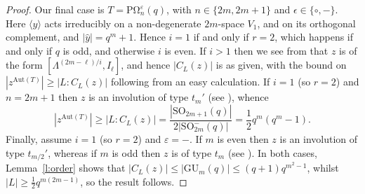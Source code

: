\documentclass[twoside,a4paper,reqno,11pt]{amsart}
\newcommand{\wy}{\widehat{y}}
\newcommand{\<}{\langle}
\renewcommand{\>}{\rangle}
\newcommand{\la}{\langle}
\newcommand{\ra}{\rangle}
\newcommand{\leqs}{\leqslant}
\newcommand{\geqs}{\geqslant}
\def\le{\leqs}
\newcommand{\Aut}{\mathrm{Aut}}
\newcommand{\POmega}{\mathrm{P\Omega}}
\newcommand{\GU}{\mathrm{GU}}
\theoremstyle{definition}
\begin{document}
\begin{proof}
Our final case is $T = \POmega_{n}^\varepsilon(q)$, with $n \in \{2m, 2m+1\}$ and $\epsilon \in \{\circ, -\}$.
Here $\la y \ra$ acts irreducibly on a non-degenerate $2m$-space $V_1$, and on its orthogonal complement, and $|\wy| = q^{m}+1$. Hence $i = 1$ if and only if $r = 2$, which happens if and only if $q$ is odd, and otherwise $i$ is even. 
If $i > 1$ then we see from \cite[Table~B.12]{BG_classical} that $z$ is of the form $[\Lambda^{(2m-\ell)/i},I_{\ell}]$, and hence $|C_{L}(z)|$ is as given, with the bound on $|z^{\Aut(T)}| \geqs |L:C_L(z)|$ following from an easy calculation.
If $i = 1$ (so $r = 2$) and $n = 2m+1$ then $z$ is an involution of type $t_m'$ (see \cite[Section 3.5.2.2]{BG_classical}), whence 
\begin{equation*}
|z^{\Aut(T)}|\geqs |L:C_L(z)| = \frac{|\mathrm{SO}_{2m+1}(q)|}{2|\mathrm{SO}_{2m}^-(q)|} = \frac{1}{2}q^m(q^m-1).
\end{equation*}
Finally, assume $i = 1$ (so $r = 2$) and $\varepsilon = -$. If $m$ is even then $z$ is an involution of type $t_{m/2}'$, whereas if $m$ is odd then $z$ is of type $t_m$ (see \cite[Sections 3.5.2.9 and 3.5.2.13]{BG_classical}). In both cases, Lemma~\ref{l:order} shows that $|C_L(z)| \le |\GU_{m}(q)| \le (q+1) q^{m^2-1}$, whilst $|L| \geqs \frac{1}{2}q^{m(2m-1)}$, so the result follows. 
       \end{proof}
\end{document}

